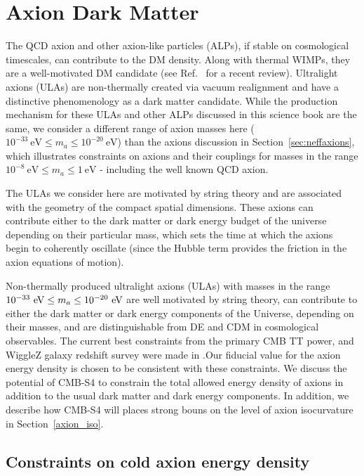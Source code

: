 \section{Axion Dark Matter}
The QCD axion and other axion-like particles (ALPs), if stable on cosmological timescales, can contribute to the DM density. Along with thermal WIMPs, they are a well-motivated DM candidate (see Ref.~\cite{Marsh:2015xka} for a recent review). Ultralight axions (ULAs) are non-thermally created via vacuum realignment and have a distinctive phenomenology as a dark matter candidate. While the production mechanism for these ULAs and other ALPs discussed in this science book are the same, we consider a different range of axion masses here ($10^{-33}~\mathrm{eV}\leq m_{a}\leq 10^{-20}~\mathrm{eV}$) than the axions discussion in Section~\ref{sec:neffaxions}, which illustrates constraints on axions and their couplings for masses in the range $10^{-8}~\mathrm{eV}\leq m_{a}\leq 1~\mathrm{eV}$ - including the well known QCD axion.

The ULAs we consider here are motivated by string theory and are associated with the geometry of the compact spatial dimensions. These axions can contribute either to the dark matter or dark energy budget of the universe depending on their particular mass, which sets the time at which the axions begin to coherently oscillate (since the Hubble term provides the friction in the axion equations of motion).

Non-thermally produced ultralight axions (ULAs) with masses in the range $10^{-33}~{\rm eV}\leq m_{a}\leq 10^{-20}~{\rm eV}$ are well motivated by string theory, can contribute to either the dark matter or dark energy components of the Universe, depending on their masses, and are distinguishable from DE and CDM in cosmological observables. The current best constraints from the primary CMB TT power, and WiggleZ galaxy redshift survey were made in \cite{Hlozek:2014lca}.Our fiducial value for the axion energy density is chosen to be consistent with these constraints. We discuss the potential of CMB-S4 to constrain the total allowed energy density of axions in addition to the usual dark matter and dark energy components. In addition, we describe how CMB-S4 will places strong bouns on the level of axion isocurvature in Section~\ref{axion_iso}.

\subsection{Constraints on cold axion energy density}

